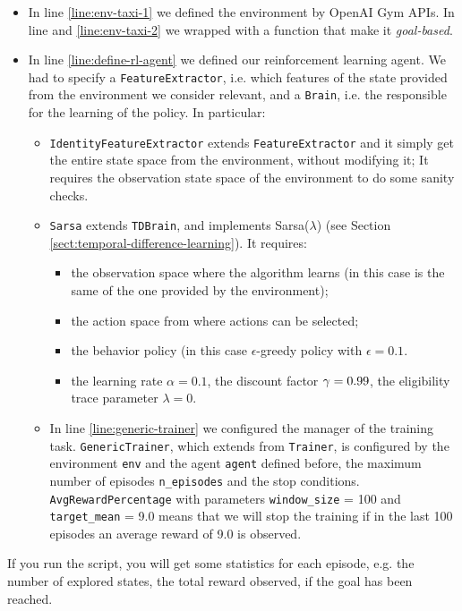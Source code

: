 \begin{itemize}
	\item In line \ref{line:env-taxi-1} we defined the environment by OpenAI Gym APIs. In line and \ref{line:env-taxi-2} we wrapped with a function that make it \emph{goal-based}.
	\item In line \ref{line:define-rl-agent} we defined our reinforcement learning agent. We had to specify a \texttt{FeatureExtractor}, i.e. which features of the state provided from the environment we consider relevant, and a \texttt{Brain}, i.e. the responsible for the learning of the policy. In particular:
	\begin{itemize}
		\item \texttt{IdentityFeatureExtractor} extends \texttt{FeatureExtractor} and it simply get the entire state space from the environment, without modifying it; It requires the observation state space of the environment to do some sanity checks.
		\item \texttt{Sarsa} extends \texttt{TDBrain}, and implements Sarsa($\lambda$) (see Section \ref{sect:temporal-difference-learning}). It requires:
		\begin{itemize}
			\item the observation space where the algorithm learns (in this case is the same of the one provided by the environment);
			\item the action space from where actions can be selected;
			\item the behavior policy (in this case $\epsilon$-greedy policy with $\epsilon = 0.1$.
			\item the learning rate $\alpha=0.1$, the discount factor $\gamma=0.99$, the eligibility trace parameter $\lambda = 0$.
		\end{itemize}
		\item In line \ref{line:generic-trainer} we configured the manager of the training task. \texttt{GenericTrainer}, which extends from \texttt{Trainer}, is configured by the environment \texttt{env} and the agent \texttt{agent} defined before, the maximum number of episodes \texttt{n\_episodes} and the stop conditions. \texttt{AvgRewardPercentage} with parameters \texttt{window\_size} = 100 and \texttt{target\_mean} = 9.0 means that we will stop the training if in the last 100 episodes an average reward of 9.0 is observed.
	\end{itemize}
\end{itemize}

If you run the script, you will get some statistics for each episode, e.g. the number of explored states, the total reward observed, if the goal has been reached.

